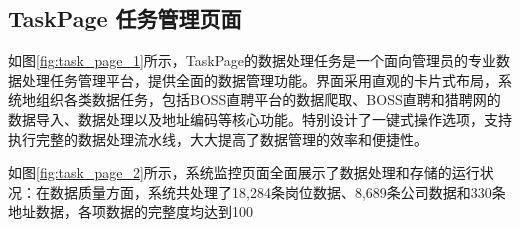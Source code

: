\subsection{TaskPage 任务管理页面}
如图\ref{fig:task_page_1}所示，TaskPage的数据处理任务是一个面向管理员的专业数据处理任务管理平台，提供全面的数据管理功能。界面采用直观的卡片式布局，系统地组织各类数据任务，包括BOSS直聘平台的数据爬取、BOSS直聘和猎聘网的数据导入、数据处理以及地址编码等核心功能。特别设计了一键式操作选项，支持执行完整的数据处理流水线，大大提高了数据管理的效率和便捷性。

如图\ref{fig:task_page_2}所示，系统监控页面全面展示了数据处理和存储的运行状况：在数据质量方面，系统共处理了18,284条岗位数据、8,689条公司数据和330条地址数据，各项数据的完整度均达到100%

